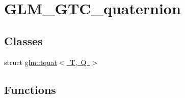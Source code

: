 \hypertarget{group__gtc__quaternion}{}\section{G\+L\+M\+\_\+\+G\+T\+C\+\_\+quaternion}
\label{group__gtc__quaternion}
\subsection*{Classes}
\begin{DoxyCompactItemize}
\item 
struct \mbox{\hyperlink{structglm_1_1tquat}{glm\+::tquat$<$ T, Q $>$}}
\end{DoxyCompactItemize}
\subsection*{Functions}
